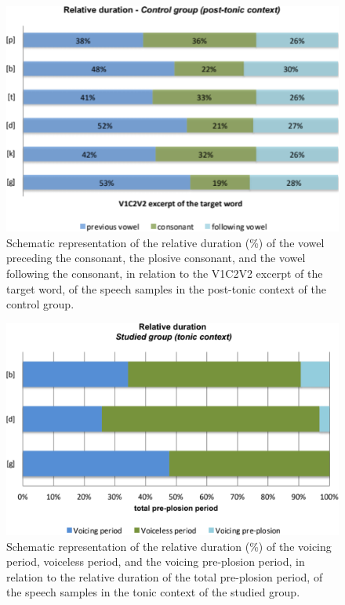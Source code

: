\begin{figure}
\centering
\includegraphics[width=0.9\linewidth]{imgs/gregio-image8.png}
\caption{Schematic representation of the relative duration (\%) of the vowel preceding the consonant, the plosive consonant, and the vowel following the consonant, in relation to the V1C2V2 excerpt of the target word, of the speech samples in the post-tonic context of the control group.} 
\label{gregio-fig08}
\end{figure}

\begin{figure}
\centering
\includegraphics[width=0.9\linewidth]{imgs/gregio-image9.png}
\caption{Schematic representation of the relative duration (\%) of the voicing period, voiceless period, and the voicing pre-plosion period, in relation to the relative duration of the total pre-plosion period, of the speech samples in the tonic context of the studied group.} 
\label{gregio-fig09}
\end{figure}

